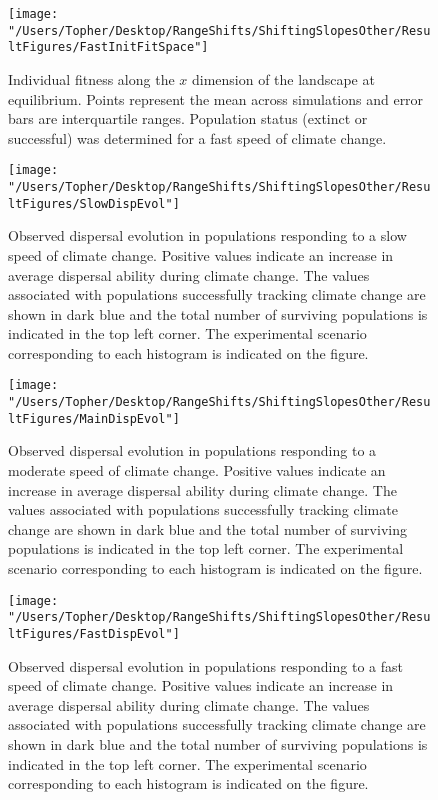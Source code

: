 \documentclass[11pt]{article}
\begin{document}
\clearpage

\begin{figure}[h!]
\texttt{[image: "/Users/Topher/Desktop/RangeShifts/ShiftingSlopesOther/ResultFigures/FastInitFitSpace"]}
\caption{Individual fitness along the $x$ dimension of the landscape at equilibrium. Points represent the mean across simulations and error bars are interquartile ranges. Population status (extinct or successful) was determined for a fast speed of climate change.}
\label{Fig:InitFitFast}
\end{figure}

\clearpage

\begin{figure}[h!]
\texttt{[image: "/Users/Topher/Desktop/RangeShifts/ShiftingSlopesOther/ResultFigures/SlowDispEvol"]}
\caption{Observed dispersal evolution in populations responding to a slow speed of climate change. Positive values indicate an increase in average dispersal ability during climate change. The values associated with populations successfully tracking climate change are shown in dark blue and the total number of surviving populations is indicated in the top left corner. The experimental scenario corresponding to each histogram is indicated on the figure.}
\label{Fig:DispEvolSlow}
\end{figure}

\clearpage

\begin{figure}[h!]
\texttt{[image: "/Users/Topher/Desktop/RangeShifts/ShiftingSlopesOther/ResultFigures/MainDispEvol"]}
\caption{Observed dispersal evolution in populations responding to a moderate speed of climate change. Positive values indicate an increase in average dispersal ability during climate change. The values associated with populations successfully tracking climate change are shown in dark blue and the total number of surviving populations is indicated in the top left corner. The experimental scenario corresponding to each histogram is indicated on the figure.}
\label{Fig:DispEvolMain}
\end{figure}

\clearpage

\begin{figure}[h!]
\texttt{[image: "/Users/Topher/Desktop/RangeShifts/ShiftingSlopesOther/ResultFigures/FastDispEvol"]}
\caption{Observed dispersal evolution in populations responding to a fast speed of climate change. Positive values indicate an increase in average dispersal ability during climate change. The values associated with populations successfully tracking climate change are shown in dark blue and the total number of surviving populations is indicated in the top left corner. The experimental scenario corresponding to each histogram is indicated on the figure.}
\label{Fig:DispEvolFast}
\end{figure}
\end{document}
